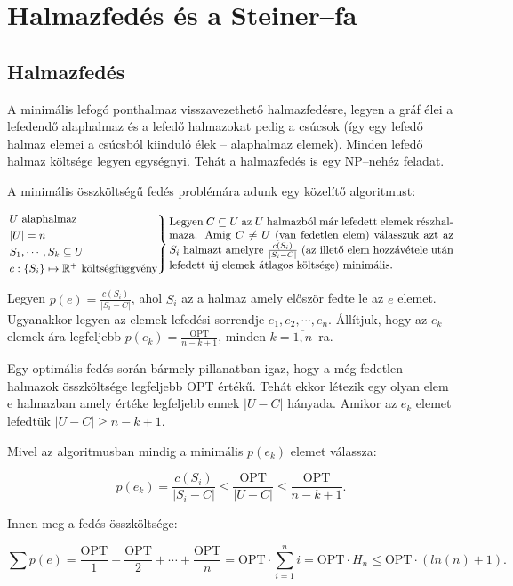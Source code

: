 \skiptooddpage 
\section{Halmazfedés és a Steiner--fa}

\subsection{Halmazfedés}
A minimális lefogó ponthalmaz visszavezethető halmazfedésre, legyen a gráf élei
a lefedendő alaphalmaz és a lefedő halmazokat pedig a csúcsok (így egy lefedő
halmaz elemei a csúcsból kiinduló élek -- alaphalmaz elemek). Minden lefedő
halmaz költsége legyen egységnyi. Tehát a halmazfedés is egy NP--nehéz feladat.

A minimális összköltségű fedés problémára adunk egy közelítő algoritmust:

\[
\begin{rcases}
U \mbox{ alaphalmaz} \\
|U| = n \\
S_1, \cdots, S_k \subseteq U \\
c : \{ S_i\} \mapsto \mathbb{R}^+ \mbox{ költségfüggvény} \end{rcases}
\parbox[L]{9cm} { Legyen $C\subseteq U$ az $U$ halmazból már lefedett elemek
részhalmaza. Amig $C \neq U$ (van fedetlen elem) válasszuk azt az $S_i$ halmazt
amelyre $\frac{c(S_i)}{|S_i-C|}$ (az illető elem hozzávétele után lefedett új
elemek átlagos költsége) minimális.
}
\]

Legyen $p(e)=\frac{c(S_i)}{|S_i-C|}$, ahol $S_i$ az a halmaz amely először fedte
le az $e$ elemet. Ugyanakkor legyen az elemek lefedési sorrendje $e_1, e_2,
\cdots, e_n$. Állítjuk, hogy az $e_k$ elemek ára legfeljebb
$p(e_k)=\frac{\mbox{OPT}}{n-k+1}$, minden $k=\overline{1,n}$--ra.

Egy
optimális fedés során bármely pillanatban igaz, hogy a még fedetlen halmazok
összköltsége legfeljebb OPT értékű. Tehát ekkor létezik egy olyan elem e
halmazban amely értéke legfeljebb ennek $|U-C|$ hányada. Amikor az $e_k$ elemet
lefedtük $|U-C| \geq n-k+1$.

Mivel az algoritmusban mindig a minimális $p(e_k)$ elemet válassza:

\[p(e_k)=\frac{c(S_i)}{|S_i-C|} \leq \frac{\mbox{OPT}}{|U-C|} \leq  \frac{\mbox{OPT}}{n-k+1}.\]

Innen meg a fedés összköltsége:

\[\sum p(e) = \frac{\mbox{OPT}}{1} + \frac{\mbox{OPT}}{2} + \cdots + \frac{\mbox{OPT}}{n}= 
\mbox{OPT} \cdot \sum_{i=1}^n i = \mbox{OPT} \cdot H_n  \leq \mbox{OPT}  \cdot (ln(n)+1). \]

